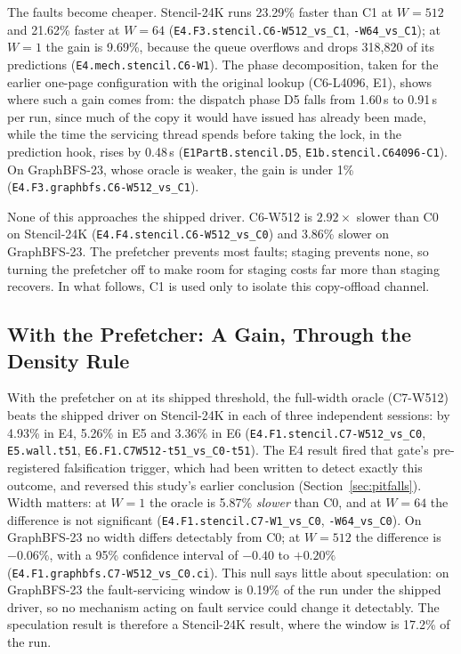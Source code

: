 The faults become cheaper. Stencil-24K runs 23.29\% faster than C1 at
$W = 512$ and 21.62\% faster at $W = 64$ (\texttt{E4.F3.stencil.C6-W512\_vs\_C1},
\texttt{-W64\_vs\_C1}); at $W = 1$ the gain is 9.69\%, because the queue
overflows and drops 318{,}820 of its predictions
(\texttt{E4.mech.stencil.C6-W1}). The phase decomposition, taken for the
earlier one-page configuration with the original lookup (C6-L4096, E1), shows
where such a gain comes from: the dispatch phase D5 falls from 1.60\,s to
0.91\,s per run, since much of the copy it would have issued has already been
made, while the time the servicing thread spends before taking the lock, in the
prediction hook, rises by 0.48\,s (\texttt{E1PartB.stencil.D5}, \texttt{E1b.stencil.C64096-C1}). On
GraphBFS-23, whose oracle is weaker, the gain is under 1\%
(\texttt{E4.F3.graphbfs.C6-W512\_vs\_C1}).

None of this approaches the shipped driver. C6-W512 is $2.92\times$ slower than
C0 on Stencil-24K (\texttt{E4.F4.stencil.C6-W512\_vs\_C0}) and 3.86\% slower on
GraphBFS-23. The prefetcher prevents most faults; staging prevents none, so
turning the prefetcher off to make room for staging costs far more than staging
recovers. In what follows, C1 is used only to isolate this copy-offload
channel.

\subsection{With the Prefetcher: A Gain, Through the Density Rule}
\label{sec:spec-on}

With the prefetcher on at its shipped threshold, the full-width oracle (C7-W512)
beats the shipped driver on Stencil-24K in each of three independent sessions:
by 4.93\% in E4, 5.26\% in E5 and 3.36\% in E6 (\texttt{E4.F1.stencil.C7-W512\_vs\_C0},
\texttt{E5.wall.t51}, \texttt{E6.F1.C7W512-t51\_vs\_C0-t51}). The E4 result
fired that gate's pre-registered falsification trigger, which had been written
to detect exactly this outcome, and reversed this study's earlier conclusion
(Section~\ref{sec:pitfalls}). Width matters: at $W = 1$ the oracle is 5.87\%
\emph{slower} than C0, and at $W = 64$ the difference is not significant
(\texttt{E4.F1.stencil.C7-W1\_vs\_C0}, \texttt{-W64\_vs\_C0}). On GraphBFS-23 no
width differs detectably from C0; at $W = 512$ the difference is $-0.06\%$,
with a 95\% confidence interval of $-0.40$ to $+0.20\%$
(\texttt{E4.F1.graphbfs.C7-W512\_vs\_C0.ci}).
This null says little about speculation: on GraphBFS-23 the fault-servicing
window is 0.19\% of the run under the shipped driver, so no mechanism acting on
fault service could change it detectably. The speculation result is therefore a
Stencil-24K result, where the window is 17.2\% of the run.

